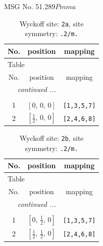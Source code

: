 \documentclass[fleqn,8pt]{jsarticle}
\begin{document}
\setcounter{MaxMatrixCols}{32}

\renewcommand{\tablename}{Table~}
\renewcommand{\figurename}{Figure~}
\begin{center}
\LARGE
MSG No. 51.289\quad$Pmma$
\end{center}
\renewcommand{\arraystretch}{1.2}
\begin{longtable}{ccc}
\caption{Wyckoff site: {\tt 2a}, site symmetry: {\tt .2/m.}}
 \\
 \hline \hline
No. & position & mapping \\ \hline \endfirsthead

\multicolumn{2}{l}{\tablename\ \thetable{}} \\
 \hline \hline
No. & position & mapping \\ \hline \endhead

 \hline \hline
\multicolumn{2}{r}{\footnotesize\it continued ...} \\ \endfoot

 \hline \hline
\multicolumn{2}{r}{} \\ \endlastfoot

1 & $\left[ 0,\, 0,\, 0 \right]$ & {\tt [1,3,5,7]} \\ \hline
2 & $\left[ \frac{1}{2},\, 0,\, 0 \right]$ & {\tt [2,4,6,8]} \\
\end{longtable}
\renewcommand{\arraystretch}{1.2}
\begin{longtable}{ccc}
\caption{Wyckoff site: {\tt 2b}, site symmetry: {\tt .2/m.}}
 \\
 \hline \hline
No. & position & mapping \\ \hline \endfirsthead

\multicolumn{2}{l}{\tablename\ \thetable{}} \\
 \hline \hline
No. & position & mapping \\ \hline \endhead

 \hline \hline
\multicolumn{2}{r}{\footnotesize\it continued ...} \\ \endfoot

 \hline \hline
\multicolumn{2}{r}{} \\ \endlastfoot

1 & $\left[ 0,\, \frac{1}{2},\, 0 \right]$ & {\tt [1,3,5,7]} \\ \hline
2 & $\left[ \frac{1}{2},\, \frac{1}{2},\, 0 \right]$ & {\tt [2,4,6,8]} \\
\end{longtable}
\renewcommand{\arraystretch}{1.2}
\end{document}
